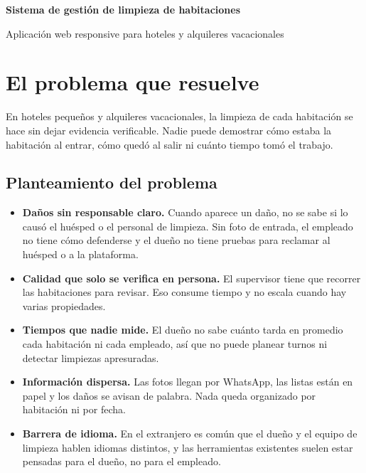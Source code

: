 \documentclass[11pt,a4paper]{article}
\begin{document}
\begin{center}
  {\sffamily\LARGE\bfseries Sistema de gestión de limpieza de habitaciones\par}
  \vspace{0.4em}
  {\sffamily\large\color{texto2} Aplicación web responsive para hoteles y alquileres vacacionales\par}
\end{center}
\vspace{0.5em}

\section{El problema que resuelve}

En hoteles pequeños y alquileres vacacionales, la limpieza de cada habitación se hace sin dejar evidencia verificable. Nadie puede demostrar cómo estaba la habitación al entrar, cómo quedó al salir ni cuánto tiempo tomó el trabajo.

\subsection{Planteamiento del problema}

\begin{itemize}[leftmargin=1.2em]
  \item \textbf{Daños sin responsable claro.} Cuando aparece un daño, no se sabe si lo causó el huésped o el personal de limpieza. Sin foto de entrada, el empleado no tiene cómo defenderse y el dueño no tiene pruebas para reclamar al huésped o a la plataforma.
  \item \textbf{Calidad que solo se verifica en persona.} El supervisor tiene que recorrer las habitaciones para revisar. Eso consume tiempo y no escala cuando hay varias propiedades.
  \item \textbf{Tiempos que nadie mide.} El dueño no sabe cuánto tarda en promedio cada habitación ni cada empleado, así que no puede planear turnos ni detectar limpiezas apresuradas.
  \item \textbf{Información dispersa.} Las fotos llegan por WhatsApp, las listas están en papel y los daños se avisan de palabra. Nada queda organizado por habitación ni por fecha.
  \item \textbf{Barrera de idioma.} En el extranjero es común que el dueño y el equipo de limpieza hablen idiomas distintos, y las herramientas existentes suelen estar pensadas para el dueño, no para el empleado.
\end{itemize}
\end{document}
